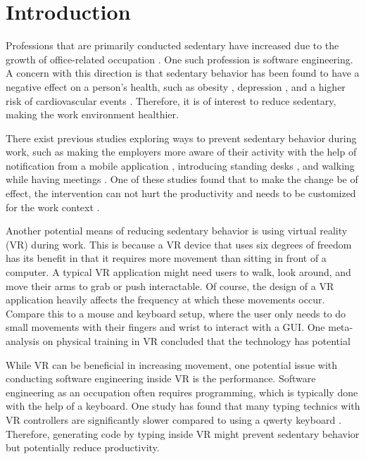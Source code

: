 \documentclass[screen, sigcconf]{timtm}
\begin{document}
\section{Introduction}

Professions that are primarily conducted sedentary have increased due to the growth of office-related occupation \cite{parry_contribution_2013}. One such profession is software engineering. A concern with this direction is that sedentary behavior has been found to have a negative effect on a person's health, such as obesity \cite{lakdawalla_labor_2007}, depression \cite{zhai_sedentary_2015}, and a higher risk of cardiovascular events \cite{straker_sedentary_2016}. Therefore, it is of interest to reduce sedentary, making the work environment healthier.

There exist previous studies exploring ways to prevent sedentary behavior during work, such as making the employers more aware of their activity with the help of notification from a mobile application \cite{cole_they_2015}, introducing standing desks \cite{pronk_reducing_2012}, and walking while having meetings \cite{bort-roig_uptake_2014}. One of these studies found that to make the change be of effect, the intervention can not hurt the productivity and needs to be customized for the work context \cite{bort-roig_uptake_2014}.


Another potential means of reducing sedentary behavior is using virtual reality (VR) during work. This is because a VR device that uses six degrees of freedom has its benefit in that it requires more movement than sitting in front of a computer. A typical VR application might need users to walk, look around, and move their arms to grab or push interactable. Of course, the design of a VR application heavily affects the frequency at which these movements occur. Compare this to a mouse and keyboard setup, where the user only needs to do small movements with their fingers and wrist to interact with a GUI. One meta-analysis on physical training in VR concluded that the technology has potential \cite{ng_effectiveness_2019}

While VR can be beneficial in increasing movement, one potential issue with conducting software engineering inside VR is the performance. Software engineering as an occupation often requires programming, which is typically done with the help of a keyboard. One study has found that many typing technics with VR controllers are significantly slower compared to using a qwerty keyboard \cite{speicher_selection-based_2018}. Therefore, generating code by typing inside VR might prevent sedentary behavior but potentially reduce productivity.
\end{document}
